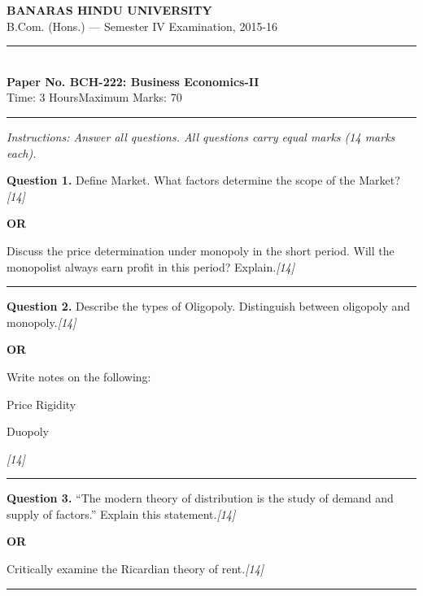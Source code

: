 \documentclass[11pt,a4paper]{article}
\newcommand{\pts}[1]{\hfill   \textit{[#1]}}
\begin{document}
\begin{center}
  {\large\bfseries BANARAS HINDU UNIVERSITY}\\[2pt]
  {\normalsize B.Com. (Hons.) --- Semester IV Examination, 2015-16}\\[6pt]
  \rule{0.8\linewidth}{0.5pt}\\[6pt]
  {\large\bfseries Paper No. BCH-222: Business Economics-II}\\[4pt]
  {\normalsize Time: 3 Hours\hfill Maximum Marks: 70}
\end{center}

\rule{\linewidth}{0.4pt}

\smallskip



\noindent   \textit{Instructions: Answer all questions. All questions carry equal marks (14 marks each).}

\bigskip




\noindent   \textbf{Question 1.}
Define Market. What factors determine the scope of the Market?\pts{14}

\centerline{   \textbf{OR}}

Discuss the price determination under monopoly in the short period. Will the monopolist always earn profit in this period? Explain.\pts{14}

\medskip\rule{\linewidth}{0.2pt}




\noindent   \textbf{Question 2.}
Describe the types of Oligopoly. Distinguish between oligopoly and monopoly.\pts{14}

\centerline{   \textbf{OR}}

Write notes on the following:

\begin{parts}
  \item Price Rigidity
  \item Duopoly
\end{parts}\pts{14}

\medskip\rule{\linewidth}{0.2pt}




\noindent   \textbf{Question 3.}
``The modern theory of distribution is the study of demand and supply of factors.'' Explain this statement.\pts{14}

\centerline{   \textbf{OR}}

Critically examine the Ricardian theory of rent.\pts{14}

\medskip\rule{\linewidth}{0.2pt}
\end{document}
